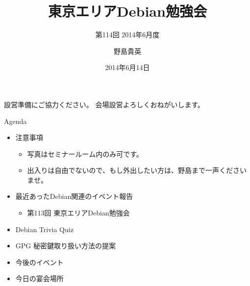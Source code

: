 \title{東京エリアDebian勉強会}
\subtitle{第114回 2014年6月度}
\author{野島貴英}
\date{2014年6月14日}



\begin{frame}
\titlepage{}
\end{frame}

\begin{frame}{設営準備にご協力ください。}
会場設営よろしくおねがいします。
\end{frame}

\begin{frame}{Agenda}
 \begin{minipage}[t]{0.45\hsize}
  \begin{itemize}
   \item 注意事項
	 \begin{itemize}
	  \item 写真はセミナールーム内のみ可です。
          \item 出入りは自由でないので、もし外出したい方は、野島まで一声くださいませ。
	 \end{itemize}
   \item 最近あったDebian関連のイベント報告
	 \begin{itemize}
	  \item 第113回 東京エリアDebian勉強会
	 \end{itemize}
  \end{itemize}
 \end{minipage} 
 \begin{minipage}[t]{0.45\hsize}
  \begin{itemize}
   \item Debian Trivia Quiz
   \item GPG 秘密鍵取り扱い方法の提案
   \item 今後のイベント
   \item 今日の宴会場所
  \end{itemize}
 \end{minipage}
\end{frame}

